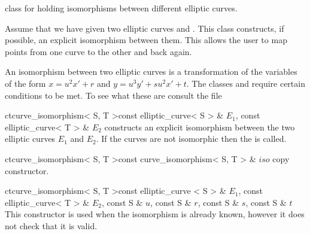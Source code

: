 
\newcommand{\iso}{\mathit{iso}}



\NAME

 \dotfill class for holding isomorphisms between different
elliptic curves.



\ABSTRACT

Assume that we have given two elliptic curves  and
.  This class constructs, if possible, an explicit isomorphism
between them.  This allows the user to map points from one curve to the other and back again.



\DESCRIPTION

An isomorphism between two elliptic curves is a transformation of the variables of the form $x =
u^2 x'+ r$ and $y =u^3 y' + s u^2 x' + t$.  The classes  and  require certain
conditions to be met.  To see what these are consult the file 



\CONS

\begin{fcode}{ct}{curve_isomorphism< S, T >}{const elliptic_curve< S > & $E_1$,
    const elliptic_curve< T > & $E_2$}%
  constructs an explicit isomorphism between the two elliptic curves $E_1$ and $E_2$.  If the
  curves are not isomorphic then the \LEH is called.
\end{fcode}

\begin{fcode}{ct}{curve_isomorphism< S, T >}{const curve_isomorphism< S, T > & $\iso$}
  copy constructor.
\end{fcode}

\begin{fcode}{ct}{curve_isomorphism< S, T >}{const elliptic_curve < S > & $E_1$,
    const elliptic_curve< T > & $E_2$, const S & $u$, const S & $r$, const S & $s$, const S & $t$}%
  This constructor is used when the isomorphism is already known, however it does not check that
  it is valid.
\end{fcode}

